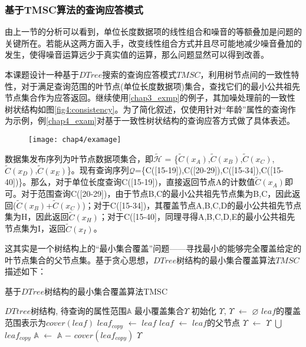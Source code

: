 \subsubsection{基于TMSC算法的查询应答模式}

由上一节的分析可以看到，单位长度数据项的线性组合和噪音的等额叠加是问题的关键所在。若能从这两方面入手，改变线性组合方式并且尽可能地减少噪音叠加的发生，使得噪音运算远少于真实值的运算，那么问题显然可以得到改善。

本课题设计一种基于$DTree$搜索的查询应答模式$TMSC$，利用树节点间的一致性特性，对于满足查询范围的叶节点(单位长度数据项)集合，查找它们的最小公共祖先节点集合作为应答返回。继续使用\ref{chap3_exmp}的例子，其加噪处理前的一致性树状结构如图\ref{fig4:consistency}。为了简化叙述，仅使用针对“年龄”属性的查询作为示例，例\ref{chap4_exam}对基于一致性树状结构的查询应答方式做了具体表述。

\begin{figure}[!htp]
	\centering
	\texttt{[image: chap4/examage]}
\end{figure}

\begin{exmp}
	\label{chap4_exam}
数据集发布序列为叶节点数据项集合，即$\tilde{\mathcal{H}}$ = \{$\tilde{C}(x_{A})$,$\tilde{C}(x_{B})$,$\tilde{C}(x_{C})$,$\tilde{C}(x_{D})$,$\tilde{C}(x_{E})$\}。现有查询序列$\mathcal{Q}$=\{C([15-19]),C([20-29]),C([15-34]),C([15-40])\}。那么，对于单位长度查询C([15-19])，直接返回节点A的计数值$\tilde{C}(x_{A})$即可。对于范围查询C([20-29])，由于节点B,C的最小公共祖先节点集为{B,C}，因此返回($\tilde{C}(x_{B})$+$\tilde{C}(x_{C})$)；对于C([15-34])，其覆盖节点A,B,C,D的最小公共祖先节点集为{H}，因此返回$\tilde{C}(x_{H})$；对于C([15-40]，同理寻得A,B,C,D,E的最小公共祖先节点集为{I}，返回$\tilde{C}(x_{I})$。
\end{exmp}

这其实是一个树结构上的“最小集合覆盖”问题——寻找最小的能够完全覆盖给定的叶节点集合的父节点集。基于贪心思想，$DTree$树结构的最小集合覆盖算法$TMSC$描述如下：

\begin{algorithm}[H]
	\caption{基于$DTree$树结构的最小集合覆盖算法TMSC}\label{euclid}
	\label{msc}
	\begin{algorithmic}[1]
		\REQUIRE $DTtree$树结构, 待查询的属性范围$\mathbb{A}$
		\ENSURE 最小覆盖集合$\Upsilon$
		初始化 $\Upsilon$, $\Upsilon$ $\leftarrow$ $\varnothing$
		\STATE $leaf$的覆盖范围表示为$cover(leaf)$
		\STATE $leaf_{copy}$ $\leftarrow$ $leaf$
		\STATE $leaf$ $\leftarrow$ $leaf$的父节点
		\ENDWHILE 
		\STATE $\Upsilon$ $\leftarrow$ $\Upsilon$ $\bigcup$ $leaf_{copy}$
		\STATE $\mathbb{A}$ $\leftarrow$ $\mathbb{A}$ $-$ $cover(leaf_{copy})$
		\RETURN $\Upsilon$
		\ENDIF
		\ENDFOR
	\end{algorithmic}
\end{algorithm}

